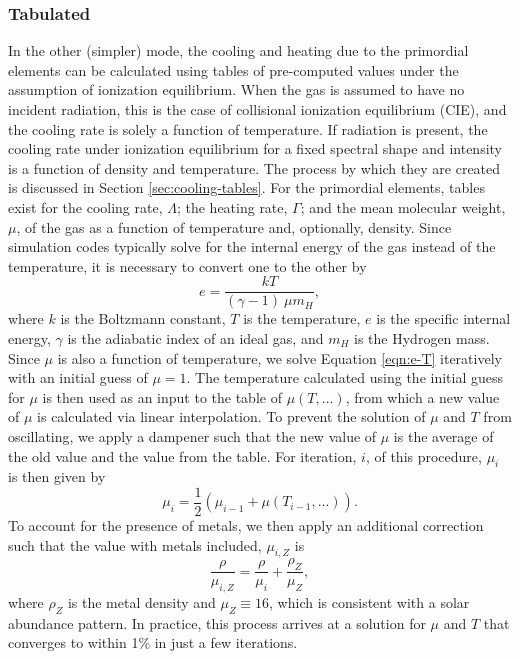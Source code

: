 \subsubsection{Tabulated} \label{sec:pri-tab}

In the other (simpler) mode, the cooling and heating due to the primordial
elements can be calculated using tables of pre-computed values under
the assumption of ionization equilibrium.  When the gas is assumed to
have no incident radiation, this is the case of collisional ionization
equilibrium (CIE), and the cooling rate is solely a function of
temperature.  If radiation is present, the cooling rate under
ionization equilibrium for a fixed spectral shape and intensity is a
function of density and temperature.  The process by which they are
created is discussed in Section \ref{sec:cooling-tables}.  For the
primordial elements, tables exist for the cooling rate, $\Lambda$;
the heating rate, $\Gamma$; and the mean molecular weight, $\mu$, of
the gas as a function of temperature and, optionally, density.  Since
simulation codes typically solve for the internal energy of the gas
instead of the temperature, it is necessary to convert one to the
other by
\begin{equation} \label{eqn:e-T}
e = \frac{k T}{(\gamma - 1)\ \mu m_{H}},
\end{equation}
where $k$ is the Boltzmann constant, $T$ is the temperature, $e$ is
the specific internal energy, $\gamma$ is the adiabatic index of an
ideal gas, and $m_{H}$ is the Hydrogen mass.  Since $\mu$ is also a
function of temperature, we solve Equation \ref{eqn:e-T} iteratively
with an initial guess of $\mu = 1$.  The temperature calculated using
the initial guess for $\mu$ is then used as an input to the table of
$\mu(T,...)$, from which a new value of $\mu$ is calculated via
linear interpolation.  To prevent the solution of $\mu$ and $T$ from
oscillating, we apply a dampener such that the new value of $\mu$ is
the average of the old value and the value from the table.  For
iteration, $i$, of this procedure, $\mu_{i}$ is then given by
\begin{equation}
\mu_{i} = \frac{1}{2} (\mu_{i-1} + \mu(T_{i-1},...)).
\end{equation}
To account for the presence of metals, we then apply an additional
correction such that the value with metals included, $\mu_{i, Z}$ is
\begin{equation}
\frac{\rho}{\mu_{i, Z}} = \frac{\rho}{\mu_{i}} +
\frac{\rho_{Z}}{\mu_{Z}},
\end{equation}
where $\rho_{Z}$ is the metal density and $\mu_{Z} \equiv 16$, which
is consistent with a solar abundance pattern.  In practice, this
process arrives at a solution for $\mu$ and $T$ that converges to
within 1\% in just a few iterations.

